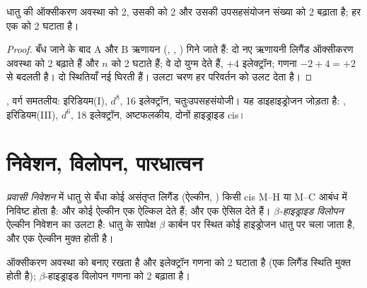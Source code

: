 \begin{proposition}[ऑक्सीकारी योग की गणना]\label{prop:b2:catalytic-cycles:oa}
 धातु की ऑक्सीकरण अवस्था को 2, उसकी  को 2 और उसकी उपसहसंयोजन संख्या को 2 बढ़ाता है;  हर एक को 2 घटाता है।
\end{proposition}

\begin{proof}
बँध जाने के बाद A और B ऋणायन (, , ) गिने जाते हैं: दो नए ऋणायनी
लिगैंड ऑक्सीकरण अवस्था को 2 बढ़ाते हैं और $n$ को 2 घटाते हैं; वे दो युग्म देते हैं, $+4$
इलेक्ट्रॉन; गणना $-2 + 4 = +2$ से बदलती है। दो स्थितियाँ नई घिरती हैं।
उलटा चरण हर परिवर्तन को उलट देता है।
\end{proof}

\begin{example}[वास्का संकुल]\label{ex:b2:catalytic-cycles:vaska}
, वर्ग समतलीय: इरिडियम(I), $d^8$, 16 इलेक्ट्रॉन, चतुःउपसहसंयोजी।
यह डाइहाइड्रोजन जोड़ता है: , इरिडियम(III), $d^6$, 18 इलेक्ट्रॉन, अष्टफलकीय,
दोनों हाइड्राइड cis।
\end{example}

\section{निवेशन, विलोपन, पारधात्वन}

\begin{definition}[निवेशन और $\beta$-हाइड्राइड विलोपन]\label{def:b2:catalytic-cycles:insertion}
\emph{प्रवासी निवेशन} में धातु से बँधा कोई असंतृप्त लिगैंड
(ऐल्कीन, ) किसी cis M--H या M--C आबंध में निविष्ट होता है:  और कोई
ऐल्कीन एक ऐल्किल  देते हैं;  और  एक ऐसिल  देते हैं।
\emph{$\beta$-हाइड्राइड विलोपन}
ऐल्कीन निवेशन का उलटा है: धातु के सापेक्ष $\beta$ कार्बन पर स्थित कोई हाइड्रोजन
धातु पर चला जाता है, और एक ऐल्कीन मुक्त होती है।
\end{definition}

\begin{proposition}[निवेशन की गणना]\label{prop:b2:catalytic-cycles:insertion}
 ऑक्सीकरण अवस्था को बनाए रखता है और इलेक्ट्रॉन गणना को 2 घटाता है
(एक लिगैंड स्थिति मुक्त होती है); $\beta$-हाइड्राइड विलोपन गणना को 2 बढ़ाता है।
\end{proposition}

